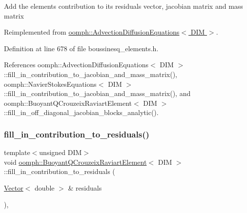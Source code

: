 Add the element\textquotesingle{}s contribution to its residuals vector, jacobian matrix and mass matrix 

Reimplemented from \hyperlink{classoomph_1_1AdvectionDiffusionEquations_aed50fe00556434c01bc855766edeb564}{oomph\+::\+Advection\+Diffusion\+Equations$<$ D\+I\+M $>$}.



Definition at line 678 of file boussinesq\+\_\+elements.\+h.



References oomph\+::\+Advection\+Diffusion\+Equations$<$ D\+I\+M $>$\+::fill\+\_\+in\+\_\+contribution\+\_\+to\+\_\+jacobian\+\_\+and\+\_\+mass\+\_\+matrix(), oomph\+::\+Navier\+Stokes\+Equations$<$ D\+I\+M $>$\+::fill\+\_\+in\+\_\+contribution\+\_\+to\+\_\+jacobian\+\_\+and\+\_\+mass\+\_\+matrix(), and oomph\+::\+Buoyant\+Q\+Crouzeix\+Raviart\+Element$<$ D\+I\+M $>$\+::fill\+\_\+in\+\_\+off\+\_\+diagonal\+\_\+jacobian\+\_\+blocks\+\_\+analytic().

\mbox{\label{classoomph_1_1BuoyantQCrouzeixRaviartElement_ab87ed100a54d40884a70a67fcc305ecf}} 
\subsubsection{\texorpdfstring{fill\+\_\+in\+\_\+contribution\+\_\+to\+\_\+residuals()}{fill\_in\_contribution\_to\_residuals()}}
{\footnotesize\ttfamily template$<$unsigned D\+IM$>$ \\
void \hyperlink{classoomph_1_1BuoyantQCrouzeixRaviartElement}{oomph\+::\+Buoyant\+Q\+Crouzeix\+Raviart\+Element}$<$ D\+IM $>$\+::fill\+\_\+in\+\_\+contribution\+\_\+to\+\_\+residuals (\begin{DoxyParamCaption}\item[{\hyperlink{classoomph_1_1Vector}{Vector}$<$ double $>$ \&}]{residuals }\end{DoxyParamCaption})\hspace{0.3cm}{\ttfamily [inline]}, {\ttfamily [virtual]}}



